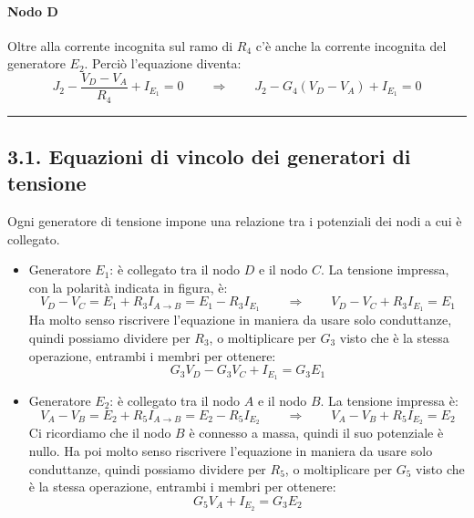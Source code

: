 \paragraph{Nodo D}
Oltre alla corrente incognita sul ramo di $R_4$ c'è anche la corrente incognita del generatore $E_2$. Perciò l'equazione diventa:
\begin{equation}
J_2 - \frac{V_D - V_A}{R_4} + I_{E_1}= 0 \qquad \Rightarrow \qquad J_2 - G_4\left(V_D-V_A\right) + I_{E_1} = 0
\label{eq:nodoD_Ohm_E}
\end{equation}









\hrule
\subsection*{3.1. Equazioni di vincolo dei generatori di tensione}

Ogni generatore di tensione impone una relazione tra i potenziali dei nodi a cui è collegato.

\begin{itemize}
    \item Generatore \(E_1\): è collegato tra il nodo \(D\) e il nodo \(C\). La tensione impressa, con la polarità indicata in figura, è:
          \begin{equation}
              V_D - V_C = E_1 + R_3I_{A \rightarrow B} = E_1 - R_3I_{E_1} \qquad \Rightarrow \qquad V_D - V_C + R_3I_{E_1} = E_1
              \label{eq:vincoloE1}
          \end{equation}
    Ha molto senso riscrivere l'equazione in maniera da usare solo conduttanze, quindi possiamo dividere per $R_3$, o moltiplicare per $G_3$ visto che è la stessa operazione, entrambi i membri per ottenere:
    \begin{equation}
        G_3V_D - G_3V_C + I_{E_1} = G_3E_1
        \label{eq:vincoloE1Conduttanze}
    \end{equation}
    \item Generatore \(E_2\): è collegato tra il nodo \(A\) e il nodo \(B\). La tensione impressa è:
          \begin{equation}
              V_A - V_B = E_2 + R_5I_{A \rightarrow B} = E_2 - R_5I_{E_2} \qquad \Rightarrow \qquad V_A - V_B + R_5I_{E_2} = E_2
              \label{eq:vincoloE2}
          \end{equation}
    Ci ricordiamo che il nodo $B$ è connesso a massa, quindi il suo potenziale è nullo. Ha poi molto senso riscrivere l'equazione in maniera da usare solo conduttanze, quindi possiamo dividere per $R_5$, o moltiplicare per $G_5$ visto che è la stessa operazione, entrambi i membri per ottenere:
    \begin{equation}
        G_5V_A + I_{E_2} = G_3E_2
        \label{eq:vincoloE2Conduttanze}
    \end{equation}
\end{itemize}


